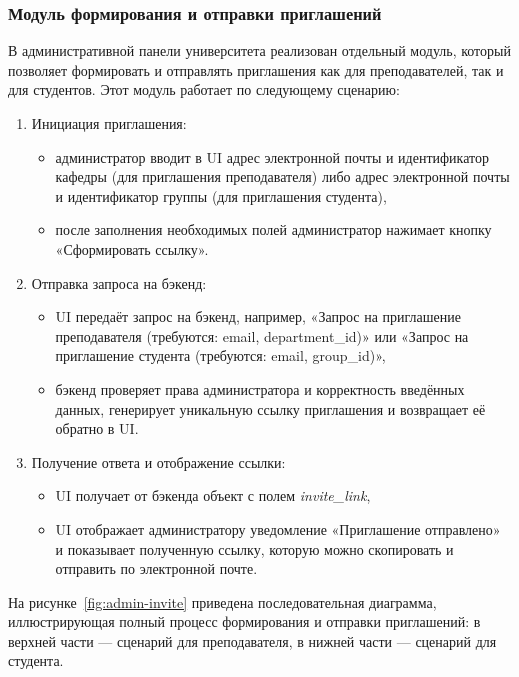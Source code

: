 \subsubsection{Модуль формирования и отправки приглашений}
В административной панели университета реализован отдельный модуль, который позволяет формировать и отправлять приглашения как для преподавателей, так и для студентов. Этот модуль работает по следующему сценарию:

\begin{enumerate}
    \item Инициация приглашения:
    \begin{itemize}
        \item администратор вводит в UI адрес электронной почты и идентификатор кафедры (для приглашения преподавателя) либо адрес электронной почты и идентификатор группы (для приглашения студента),
        \item после заполнения необходимых полей администратор нажимает кнопку «Сформировать ссылку».
    \end{itemize}
    \item Отправка запроса на бэкенд:
    \begin{itemize}
        \item UI передаёт запрос на бэкенд, например, «Запрос на приглашение преподавателя (требуются: email, department\_id)» или «Запрос на приглашение студента (требуются: email, group\_id)»,
        \item бэкенд проверяет права администратора и корректность введённых данных, генерирует уникальную ссылку приглашения и возвращает её обратно в UI.
    \end{itemize}
    \item Получение ответа и отображение ссылки:
    \begin{itemize}
        \item UI получает от бэкенда объект с полем \textit{invite\_link},
        \item UI отображает администратору уведомление «Приглашение отправлено» и показывает полученную ссылку, которую можно скопировать и отправить по электронной почте.
    \end{itemize}
\end{enumerate}

На рисунке~\ref{fig:admin-invite} приведена последовательная диаграмма, иллюстрирующая полный процесс формирования и отправки приглашений: в верхней части — сценарий для преподавателя, в нижней части — сценарий для студента.

